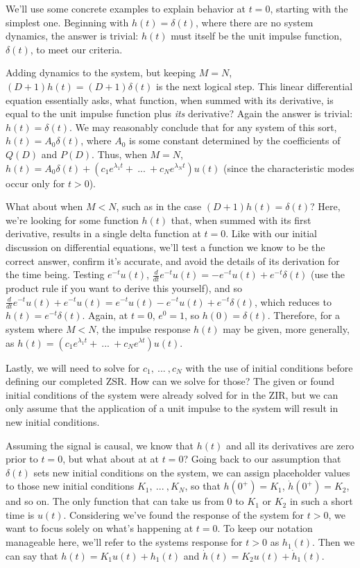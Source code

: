 \documentclass{article}
\begin{document}
We'll use some concrete examples to explain behavior at \(t=0\), starting with the simplest one. Beginning with \(h(t) = \delta(t)\), where there are no system dynamics, the answer is trivial: \(h(t)\) must itself be the unit impulse function, \(\delta(t)\), to meet our criteria.

Adding dynamics to the system, but keeping \(M=N\), \((D+1)h(t) = (D+1)\delta(t)\) is the next logical step. This linear differential equation essentially asks, what function, when summed with its derivative, is equal to the unit impulse function plus \textit{its} derivative? Again the answer is trivial: \(h(t) = \delta(t)\). We may reasonably conclude that for any system of this sort, \(h(t) = A_0\delta(t)\), where \(A_0\) is some constant determined by the coefficients of \(Q(D)\) and \(P(D)\). Thus, when \(M=N\), \(h(t) = A_0\delta(t) + (c_1e^{\lambda_1 t} + \ ... \ + c_Ne^{\lambda_N t})u(t)\) (since the characteristic modes occur only for \(t>0\)).

What about when \(M < N\), such as in the case \((D+1)h(t) = \delta(t)\)? Here, we're looking for some function \(h(t)\) that, when summed with its first derivative, results in a single delta function at \(t=0\). Like with our initial discussion on differential equations, we'll test a function we know to be the correct answer, confirm it's accurate, and avoid the details of its derivation for the time being. Testing \(e^{-t}u(t)\), \(\frac{d}{dt}e^{-t}u(t) = -e^{-t}u(t) + e^{-t}\delta(t)\) (use the product rule if you want to derive this yourself), and so \(\frac{d}{dt}e^{-t}u(t) + e^{-t}u(t) = e^{-t}u(t) - e^{-t}u(t) + e^{-t}\delta(t)\), which reduces to \(h(t) = e^{-t}\delta(t)\). Again, at \(t=0\), \(e^0=1\), so \(h(0) = \delta(t)\). Therefore, for a system where \(M < N\), the impulse response \(h(t)\) may be given, more generally, as \(h(t) = (c_1e^{\lambda_1 t} + \ ... \ + c_Ne^{\lambda t})u(t)\).   

Lastly, we will need to solve for \(c_1, \ ... \ , c_N\) with the use of initial conditions before defining our completed ZSR. How can we solve for those? The given or found initial conditions of the system were already solved for in the ZIR, but we can only assume that the application of a unit impulse to the system will result in new initial conditions.

Assuming the signal is causal, we know that \(h(t)\) and all its derivatives are zero prior to \(t=0\), but what about at at \(t=0\)? Going back to our assumption that \(\delta(t)\) sets new initial conditions on the system, we can assign placeholder values to those new initial conditions \(K_1, \ ... \ , K_N\), so that \(h(0^+) = K_1\), \(\dot{h}(0^+) = K_2\), and so on. The only function that can take us from \(0\) to \(K_1\) or \(K_2\) in such a short time is \(u(t)\). Considering we've found the response of the system for \(t>0\), we want to focus solely on what's happening at \(t=0\). To keep our notation manageable here, we'll refer to the systems response for \(t>0\) as \(h_1(t)\). Then we can say that \(h(t) = K_1u(t) + h_1(t)\) and \(\dot{h}(t) = K_2u(t) + \dot{h}_1(t)\).
\end{document}
